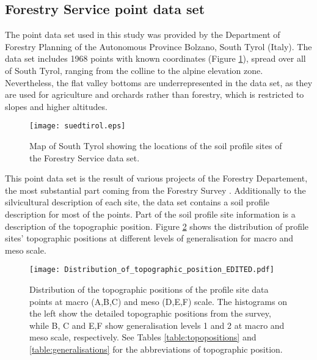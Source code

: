 \documentclass[final,1p,times,twocolumn,authoryear]{elsarticle}
\begin{document}
\subsection{Forestry Service point data set}
The point data set used in this study was provided by the Department of Forestry Planning of the Autonomous Province Bolzano, South Tyrol (Italy). The data set includes 1968 points with known coordinates (Figure \ref{fig:datapoints}), spread over all of South Tyrol, ranging from the colline to the alpine elevation zone. Nevertheless, the flat valley bottoms are underrepresented in the data set, as they are used for agriculture and orchards rather than forestry, which is restricted to slopes and higher altitudes.
\begin{figure}
\texttt{[image: suedtirol.eps]}
\caption{Map of South Tyrol showing the locations of the soil profile sites of the Forestry Service data set. }
\label{fig:datapoints}
\end{figure}
 This point data set is the result of  various projects of the Forestry Departement, the most substantial part coming from the Forestry Survey \citep{APB2006}. Additionally to the silvicultural description of each site, the data set contains a soil profile description for most of the points. Part of the soil profile site information is a description of the topographic position. Figure \ref{fig:hist} shows the distribution of profile sites' topographic positions at different levels of generalisation for macro and meso scale.



\begin{figure}
\texttt{[image: Distribution\_of\_topographic\_position\_EDITED.pdf]}
\caption{Distribution of the topographic positions of the profile site data points at macro (A,B,C) and meso (D,E,F) scale. The histograms on the left show the detailed topographic positions from the survey, while B, C and E,F show generalisation levels 1 and 2 at macro and meso scale, respectively. See Tables \ref{table:topopositions} and \ref{table:generalisations} for the abbreviations of topographic position. }
\label{fig:hist}
\end{figure}
\end{document}

